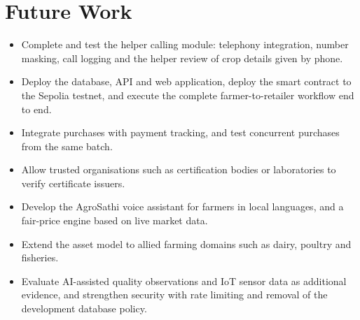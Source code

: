 \section*{Future Work}
\begin{itemize}
	\item Complete and test the helper calling module: telephony integration, number masking, call logging and the helper review of crop details given by phone.
	\item Deploy the database, API and web application, deploy the smart contract to the Sepolia testnet, and execute the complete farmer-to-retailer workflow end to end.
	\item Integrate purchases with payment tracking, and test concurrent purchases from the same batch.
	\item Allow trusted organisations such as certification bodies or laboratories to verify certificate issuers.
	\item Develop the AgroSathi voice assistant for farmers in local languages, and a fair-price engine based on live market data.
	\item Extend the asset model to allied farming domains such as dairy, poultry and fisheries.
	\item Evaluate AI-assisted quality observations and IoT sensor data as additional evidence, and strengthen security with rate limiting and removal of the development database policy.
\end{itemize}
